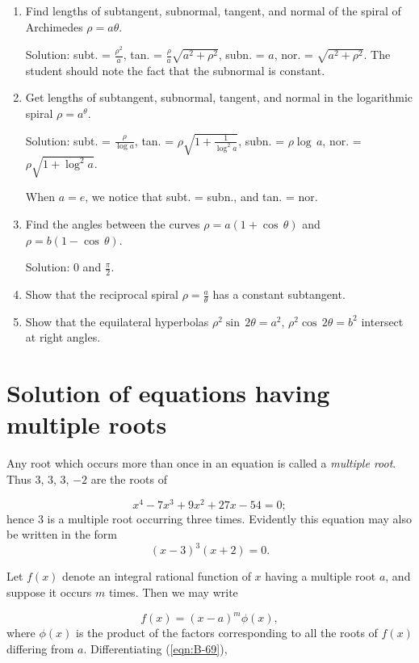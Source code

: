 \begin{enumerate}
\item
Find lengths of subtangent, subnormal, tangent, and normal of 
the spiral of Archimedes $\rho  = a\theta$.

Solution:
subt. = $\frac{\rho^2}{a}$, tan. = $\frac{\rho}{a} \sqrt{a^2 + \rho^2}$,
subn. = $a$, nor. = $\sqrt{a^2 + \rho^2}$.
The student should note the fact that the subnormal is constant.

\item
Get lengths of subtangent, subnormal, tangent, and normal 
in the logarithmic spiral $\rho  = a^\theta$.

Solution:
subt. = $\frac{\rho}{\log a}$, 	
tan. = $\rho \sqrt{1 + \frac{1}{\log^2 a}}$,
subn. = $\rho\log\, a$,
nor. = $\rho \sqrt{1 + \log^2 a}$.

When $a = e$, we notice that subt. = subn., and tan. = nor.

\item
Find the angles between the curves $\rho = a(1 + \cos\, \theta)$ and 
$\rho = b(1 - \cos\, \theta)$.

Solution: $0$ and $\frac{\pi}{2}$.

\item
Show that the reciprocal spiral $\rho = \frac{a}{\theta}$ has a 
constant subtangent.

\item
Show that the equilateral hyperbolas 
$\rho^2\sin\, 2\theta=a^2$, $\rho^2\cos\, 2\theta=b^2$
intersect at right angles.

\end{enumerate}

\section{Solution of equations having multiple roots}

Any root which occurs more than once in an equation is 
called a {\it multiple root}. Thus $3$, $3$, $3$, $-2$ are the roots of

\[
x^4 - 7x^3 + 9x^2 + 27x - 54 = 0;
\]
hence $3$ is a multiple root occurring three times.
Evidently this equation may also be written in the form
\[
    (x - 3)^3(x + 2) = 0.
\]

Let $f(x)$ denote an integral rational function of $x$ having 
a multiple root $a$, and suppose it occurs $m$ times. Then we may write

\begin{equation}	
f(x) = (x-a)^m\phi (x),
\label{eqn:B-69}
\end{equation}	
where $\phi (x)$ is the product of the factors corresponding to all 
the roots of $f(x)$ differing from $a$. Differentiating (\ref{eqn:B-69}),

